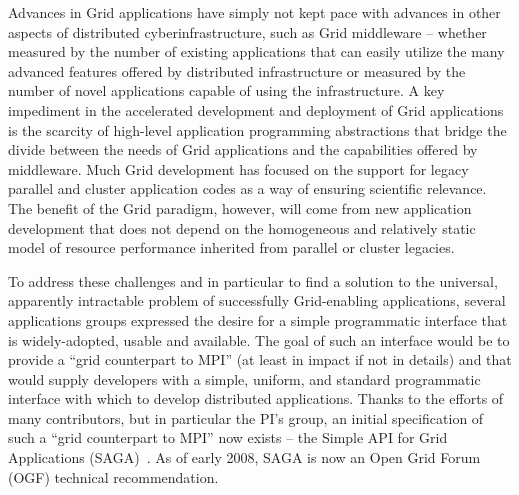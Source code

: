 \documentclass[a4paper,10pt]{article}
\begin{document}
Advances in Grid applications have simply not kept pace with advances in other aspects of distributed cyberinfrastructure, such as Grid middleware -- whether measured by the number of existing applications that can easily utilize the many advanced features offered by distributed infrastructure or measured by the number of novel applications capable of using the infrastructure. A key impediment in the accelerated development and deployment of Grid applications is the scarcity of high-level application programming abstractions that bridge the divide between the needs of Grid applications and the capabilities offered by middleware.  Much Grid development has focused on the support for legacy parallel and cluster application codes as a way of ensuring scientific relevance.  The benefit of the Grid paradigm, however, will come from new application development that does not depend on the homogeneous and relatively static model of resource performance inherited from parallel or cluster legacies.  %

To address these challenges and in particular to find a solution to the universal, apparently intractable problem of successfully Grid-enabling applications, several applications groups expressed the desire for a simple programmatic interface that is widely-adopted, usable and available.  The goal of such an interface would be to provide a ``grid counterpart to MPI'' (at least in impact if not in details) and that would supply developers with a simple, uniform, and standard programmatic interface with which to develop distributed applications.  Thanks to the efforts of many contributors, but in particular the PI's group, an initial specification of such a ``grid counterpart to MPI'' now exists -- the Simple API for Grid Applications (SAGA)~\cite{saga_url}. As of early 2008, SAGA is now an Open Grid Forum (OGF) technical recommendation.


\end{document}
